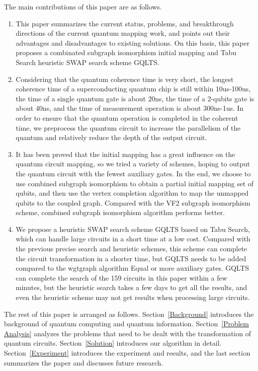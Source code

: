 \documentclass[runningheads]{llncs}
\begin{document}
The main contributions of this paper are as follows.
	\begin{enumerate}
		\item This paper summarizes the current status, problems, and breakthrough directions 
		of the current quantum mapping work, and points out their advantages and disadvantages 
		to existing solutions. On this basis, this paper proposes a  
		combinated subgraph isomorphism initial mapping and Tabu Search heuristic SWAP search scheme GQLTS.
		\item Considering that the quantum coherence time is very short, 
		the longest coherence time of a superconducting quantum chip is still within 10us-100us, 
		the time of a single quantum gate is about 20ns, 
		the time of a 2-qubits gate is about 40ns, 
		and the time of measurement operation is about 300ns-1us.
		In order to ensure that the quantum operation is completed in the coherent time,
		we preprocess the quantum circuit to increase the parallelism of the quantum and 
		relatively reduce the depth of the output circuit.
		\item It has been proved that the initial mapping has a great influence on the quantum
		 circuit mapping, so we tried a variety of schemes, 
		 hoping to output the quantum circuit with the fewest auxiliary gates. 
		 In the end, we choose to use combined subgraph isomorphism to obtain 
		 a partial initial mapping set of qubits, 
		 and then use the vertex completion algorithm to map the unmapped qubits to the coupled graph. 
		 Compared with the VF2 subgraph isomorphism scheme, 
		combined subgraph isomorphism algorithm performs better.
		\item We propose a heuristic SWAP search scheme GQLTS based on Tabu Search, 
		which can handle large circuits in a short time at a low cost.
		Compared with the previous precise search and heuristic schemes,
		this scheme can complete the circuit transformation in a shorter time, 
		but GQLTS needs to be added compared to the wgtgraph algorithm Equal or more auxiliary gates.
		GQLTS can complete the search of the 159 circuits in this paper within a few minutes, 
		but the heuristic search takes a few days to get all the results, 
		and even the heuristic scheme may not get results when processing large circuits.
	\end{enumerate}
	The rest of this paper is arranged as follows. 
	Section~\ref{Background} introduces the background of quantum computing and quantum information.
	Section~\ref{Problem Analysis} analyzes the problems that need to be dealt with the transformation of quantum circuits.
	Section~\ref{Solution} introduces our algorithm in detail. 
	Section~\ref{Experiment} introduces the experiment and results, 
	and the last section summarizes the paper and discusses future research.
\end{document}
